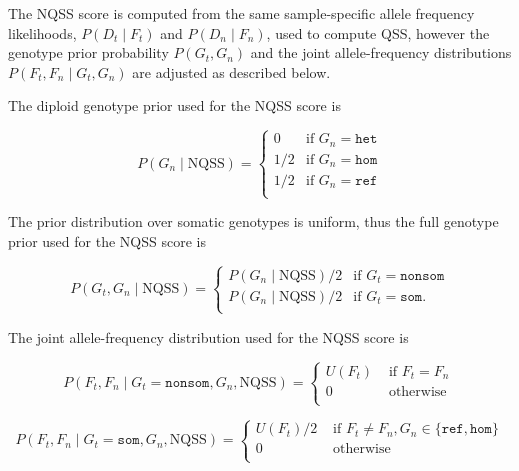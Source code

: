 \documentclass{article}
\begin{document}
The NQSS score is computed from the same sample-specific allele frequency likelihoods, $P(D_t \mid F_t)$ and $P(D_n \mid F_n)$, used to compute QSS, however the genotype prior probability $P(G_t, G_n)$ and the joint allele-frequency distributions $P(F_t,F_n \mid G_t,G_n)$ are adjusted as described below.

The diploid genotype prior used for the NQSS score is

\begin{equation*}
P(G_n\mid \text{NQSS})=
\begin{cases}
0 & \text{if } G_n = \texttt{het} \\
1/2 & \text{if } G_n = \texttt{hom} \\
1/2 & \text{if } G_n = \texttt{ref} \\
\end{cases}
\end{equation*}

The prior distribution over somatic genotypes is uniform, thus the full genotype prior used for the NQSS score is

\begin{equation*}
P(G_t, G_n \mid \text{NQSS}) =
\begin{cases}
P(G_n \mid \text{NQSS})/2 & \text{if } G_t = \texttt{nonsom} \\
P(G_n \mid \text{NQSS})/2 & \text{if } G_t = \texttt{som}. \\
\end{cases}
\end{equation*}


The joint allele-frequency distribution used for the NQSS score is

\begin{equation*}
P(F_t, F_n \mid G_t = \texttt{nonsom}, G_n, \text{NQSS})=
\begin{cases}
U(F_t) & \text{ if } F_t = F_n \\
0 & \text{ otherwise } \\
\end{cases}
\end{equation*}

\begin{equation*}
P(F_t, F_n \mid G_t = \texttt{som}, G_n, \text{NQSS})=
\begin{cases}
U(F_t)/2 & \text{ if } F_t \neq F_n, G_n \in \{\texttt{ref},\texttt{hom}\}  \\
0 & \text{ otherwise } \\
\end{cases}
\end{equation*}
\end{document}
